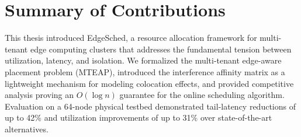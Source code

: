 \section{Summary of Contributions}

This thesis introduced EdgeSched, a resource allocation framework for multi-tenant edge computing clusters that addresses the fundamental tension between utilization, latency, and isolation. We formalized the multi-tenant edge-aware placement problem (MTEAP), introduced the interference affinity matrix as a lightweight mechanism for modeling colocation effects, and provided competitive analysis proving an \(O(\log n)\) guarantee for the online scheduling algorithm. Evaluation on a 64-node physical testbed demonstrated tail-latency reductions of up to 42\% and utilization improvements of up to 31\% over state-of-the-art alternatives.
